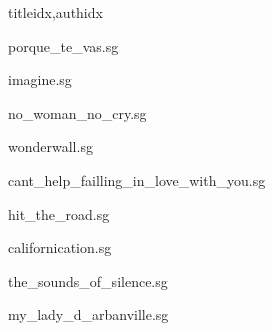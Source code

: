 \documentclass[
    ]{article}
\begin{document}
\begin{songs}{titleidx,authidx}

{porque_te_vas.sg}


{imagine.sg}


{no_woman_no_cry.sg}


{wonderwall.sg}


{cant_help_failling_in_love_with_you.sg}


{hit_the_road.sg}


{californication.sg}


{the_sounds_of_silence.sg}


{my_lady_d_arbanville.sg}

\end{songs}
\end{document}
